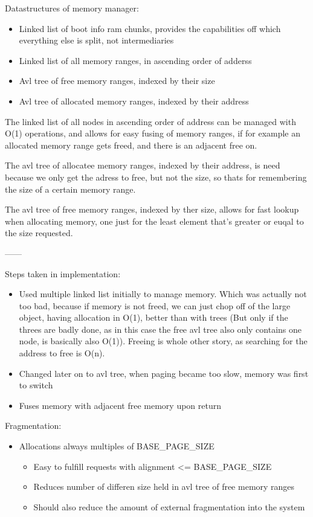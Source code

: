 Datastructures of memory manager:
\begin{itemize}
	\item Linked list of boot info ram chunks, provides the capabilities off which
				everything else is split, not intermediaries
	\item Linked list of all memory ranges, in ascending order of adderss
	\item Avl tree of free memory ranges, indexed by their size
	\item Avl tree of allocated memory ranges, indexed by their address
\end{itemize}

The linked list of all nodes in ascending order of address can be managed with
O(1) operations, and allows for easy fusing of memory ranges, if for example an
allocated memory range gets freed, and there is an adjacent free on.

The avl tree of allocatee memory ranges, indexed by their address, is need
because we only get the adress to free, but not the size, so thats for
remembering the size of a certain memory range.

The avl tree of free memory ranges, indexed by ther size, allows for fast
lookup when allocating memory, one just for the least element that's greater or
euqal to the size requested.

------

Steps taken in implementation:
\begin{itemize}
	\item Used multiple linked list initially to manage memory.
				Which was actually not too bad, because if memory is not freed, we can
				just chop off of the large object, having allocation in O(1), better than
				with trees (But only if the threes are badly done, as in this case the
				free avl tree also only contains one node, is basically also O(1)).
				Freeing is whole other story, as searching for the address to free is O(n).
	\item Changed later on to avl tree, when paging became too slow, memory was first to switch
	\item Fuses memory with adjacent free memory upon return
\end{itemize}

Fragmentation:
\begin{itemize}
	\item Allocations always multiples of BASE\_PAGE\_SIZE
	\begin{itemize}
		\item Easy to fulfill requests with alignment <= BASE\_PAGE\_SIZE
		\item Reduces number of differen size held in avl tree of free memory ranges
		\item Should also reduce the amount of external fragmentation into the system
	\end{itemize}
\end{itemize}

